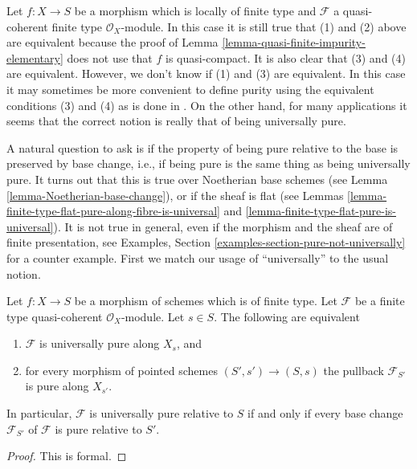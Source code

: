 \begin{remark}
\label{remark-discuss-finite-type}
Let $f : X \to S$ be a morphism which is locally of finite type
and $\mathcal{F}$ a quasi-coherent finite type $\mathcal{O}_X$-module.
In this case it is still true that (1) and (2) above are equivalent
because the proof of
Lemma \ref{lemma-quasi-finite-impurity-elementary}
does not use that $f$ is quasi-compact. It is also clear that
(3) and (4) are equivalent. However, we don't know if (1) and (3) are
equivalent. In this case it may sometimes be more convenient to define
purity using the equivalent conditions (3) and (4) as is done in \cite{GruRay}.
On the other hand, for many applications it seems that the correct notion
is really that of being universally pure.
\end{remark}

\noindent
A natural question to ask is if the property of being pure relative to
the base is preserved by base change, i.e., if being pure is the same
thing as being universally pure. It turns out that this is true
over Noetherian base schemes (see
Lemma \ref{lemma-Noetherian-base-change}),
or if the sheaf is flat (see
Lemmas \ref{lemma-finite-type-flat-pure-along-fibre-is-universal} and
\ref{lemma-finite-type-flat-pure-is-universal}).
It is not true in general, even if the morphism and the sheaf are of
finite presentation, see
Examples, Section \ref{examples-section-pure-not-universally}
for a counter example. First we match our usage of ``universally''
to the usual notion.

\begin{lemma}
\label{lemma-base-change-universally}
Let $f : X \to S$ be a morphism of schemes which is of finite type.
Let $\mathcal{F}$ be a finite type quasi-coherent $\mathcal{O}_X$-module.
Let $s \in S$. The following are equivalent
\begin{enumerate}
\item $\mathcal{F}$ is universally pure along $X_s$, and
\item for every morphism of pointed schemes $(S', s') \to (S, s)$
the pullback $\mathcal{F}_{S'}$ is pure along $X_{s'}$.
\end{enumerate}
In particular, $\mathcal{F}$ is universally pure relative to $S$ if and
only if every base change $\mathcal{F}_{S'}$ of $\mathcal{F}$ is
pure relative to $S'$.
\end{lemma}

\begin{proof}
This is formal.
\end{proof}

